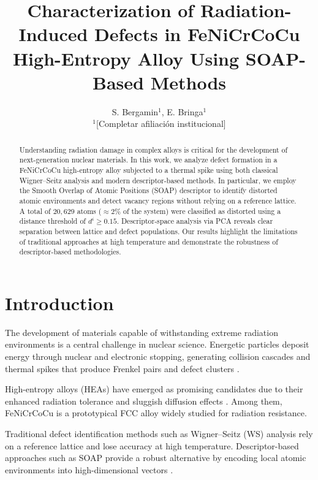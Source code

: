 \documentclass[11pt]{article}
\title{\textbf{Characterization of Radiation-Induced Defects in FeNiCrCoCu
High-Entropy Alloy Using SOAP-Based Methods}}
\author{
S. Bergamin$^{1}$, E. Bringa$^{1}$ \\[4pt]
$^{1}$[Completar afiliación institucional]
}
\date{}
\begin{document}
\maketitle

\begin{abstract}
Understanding radiation damage in complex alloys is critical for the development
of next-generation nuclear materials. In this work, we analyze defect formation
in a FeNiCrCoCu high-entropy alloy subjected to a thermal spike using both
classical Wigner--Seitz analysis and modern descriptor-based methods. In
particular, we employ the Smooth Overlap of Atomic Positions (SOAP) descriptor
to identify distorted atomic environments and detect vacancy regions without
relying on a reference lattice. A total of $20{,}629$ atoms ($\approx 2\%$ of
the system) were classified as distorted using a distance threshold of
$d^i \geq 0.15$. Descriptor-space analysis via PCA reveals clear separation
between lattice and defect populations. Our results highlight the limitations
of traditional approaches at high temperature and demonstrate the robustness of
descriptor-based methodologies.
\end{abstract}

\section{Introduction}

The development of materials capable of withstanding extreme radiation
environments is a central challenge in nuclear science. Energetic particles
deposit energy through nuclear and electronic stopping, generating collision
cascades and thermal spikes that produce Frenkel pairs and defect clusters
\cite{Was2017, Zinkle2009}.

High-entropy alloys (HEAs) have emerged as promising candidates due to their
enhanced radiation tolerance and sluggish diffusion effects
\cite{Yeh2004, Cantor2004, Zhang2015radiation, Granberg2016}. Among them,
FeNiCrCoCu is a prototypical FCC alloy widely studied for radiation resistance.

Traditional defect identification methods such as Wigner--Seitz (WS) analysis
rely on a reference lattice and lose accuracy at high temperature.
Descriptor-based approaches such as SOAP provide a robust alternative by
encoding local atomic environments into high-dimensional vectors
\cite{Bartok2013}.
\end{document}
